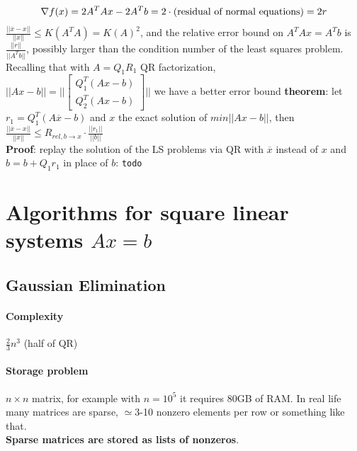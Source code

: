 \documentclass[10pt]{report}
\begin{document}
$$\nabla f(x) = 2A^TAx-2A^Tb = 2\cdot(\hbox{residual of normal equations}) = 2r$$
$\frac{||\overline{x}-x||}{||x||}\leq K(A^TA) = K(A)^2$, and the relative error bound on $A^TAx=A^Tb$ is $\frac{||r||}{||A^Tb||}$, possibly larger than the condition number of the least squares problem.\\
Recalling that with $A=Q_1R_1$ QR factorization, $||Ax-b||=||\left[\begin{array}{c}
Q_1^T(Ax-b)\\Q_2^T(Ax-b)
\end{array}\right]||$
we have a better error bound \textbf{theorem}: let $r_1 = Q_1^T(A\overline{x}-b)$ and $x$ the exact solution of $min||Ax-b||$, then $\frac{||\overline{x}-x||}{||x||}\leq R_{rel, b\rightarrow x}\cdot\frac{||r_1||}{||b||}$\\
\textbf{Proof}: replay the solution of the LS problems via QR with $\overline{x}$ instead of $x$ and $\hat{b}=b+Q_1r_1$ in place of $b$: \texttt{todo} %
\section{Algorithms for square linear systems $Ax=b$}
\subsection{Gaussian Elimination}
\paragraph{Complexity} $\frac{2}{3}n^3$ (half of QR)
\paragraph{Storage problem} $n\times n$ matrix, for example with $n=10^5$ it requires 80GB of RAM. In real life many matrices are sparse, $\simeq$3-10 nonzero elements per row or something like that.\\
\textbf{Sparse matrices are stored as lists of nonzeros}.
\end{document}
